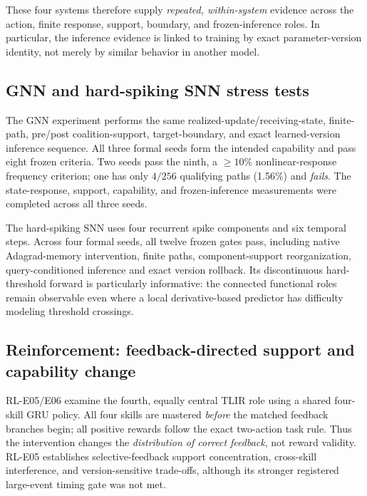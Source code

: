 \documentclass{article}
\begin{document}
These four systems therefore supply \emph{repeated, within-system} evidence across the action, finite response, support, boundary, and frozen-inference roles. In particular, the inference evidence is linked to training by exact parameter-version identity, not merely by similar behavior in another model.

\subsection{GNN and hard-spiking SNN stress tests}
The GNN experiment performs the same realized-update/receiving-state, finite-path, pre/post coalition-support, target-boundary, and exact learned-version inference sequence. All three formal seeds form the intended capability and pass eight frozen criteria. Two seeds pass the ninth, a $\geq 10\%$ nonlinear-response frequency criterion; one has only $4/256$ qualifying paths (1.56\%) and \emph{fails}. The state-response, support, capability, and frozen-inference measurements were completed across all three seeds.

The hard-spiking SNN uses four recurrent spike components and six temporal steps. Across four formal seeds, all twelve frozen gates pass, including native Adagrad-memory intervention, finite paths, component-support reorganization, query-conditioned inference and exact version rollback. Its discontinuous hard-threshold forward is particularly informative: the connected functional roles remain observable even where a local derivative-based predictor has difficulty modeling threshold crossings. 

\subsection{Reinforcement: feedback-directed support and capability change}
RL-E05/E06 examine the fourth, equally central TLIR role using a shared four-skill GRU policy. All four skills are mastered \emph{before} the matched feedback branches begin; all positive rewards follow the exact two-action task rule. Thus the intervention changes the \emph{distribution of correct feedback}, not reward validity. RL-E05 establishes selective-feedback support concentration, cross-skill interference, and version-sensitive trade-offs, although its stronger registered large-event timing gate was not met.
\end{document}
